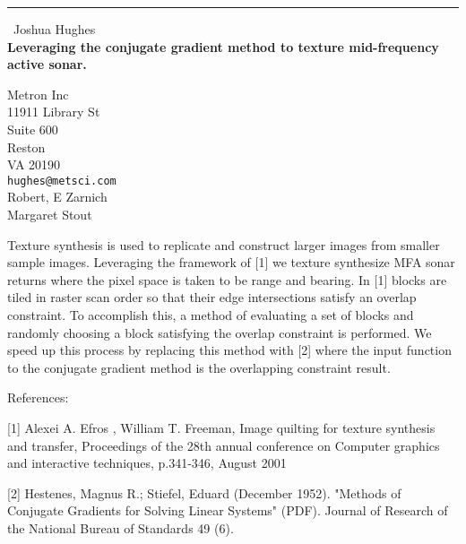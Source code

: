 \documentclass{report}
\begin{document}
\begin{center}
\rule{6in}{1pt} \
{\large Joshua Hughes \\
{\bf Leveraging the conjugate gradient method to texture mid-frequency active sonar.}}

Metron Inc \\ 11911 Library St \\ Suite 600 \\ Reston \\ VA 20190
\\
{\tt hughes@metsci.com}\\
Robert, E Zarnich\\
Margaret Stout\end{center}

Texture synthesis is used to replicate and construct larger images from
smaller sample images. Leveraging the framework of [1] we texture
synthesize MFA sonar returns where the pixel space is taken to be range
and bearing. In [1] blocks are tiled in raster scan order so that their
edge intersections satisfy an overlap constraint. To accomplish this, a
method of evaluating a set of blocks and randomly choosing a block
satisfying the overlap constraint is performed. We speed up this process
by replacing this method with [2] where the input function to the
conjugate gradient method is the overlapping constraint result.

References:

[1] Alexei A. Efros , William T. Freeman, Image quilting for texture
synthesis and transfer, Proceedings of the 28th annual conference on
Computer graphics and interactive techniques, p.341-346, August 2001

[2] Hestenes, Magnus R.; Stiefel, Eduard (December 1952). "Methods of
Conjugate Gradients for Solving Linear Systems" (PDF). Journal of
Research of the National Bureau of Standards 49 (6).
\end{document}
